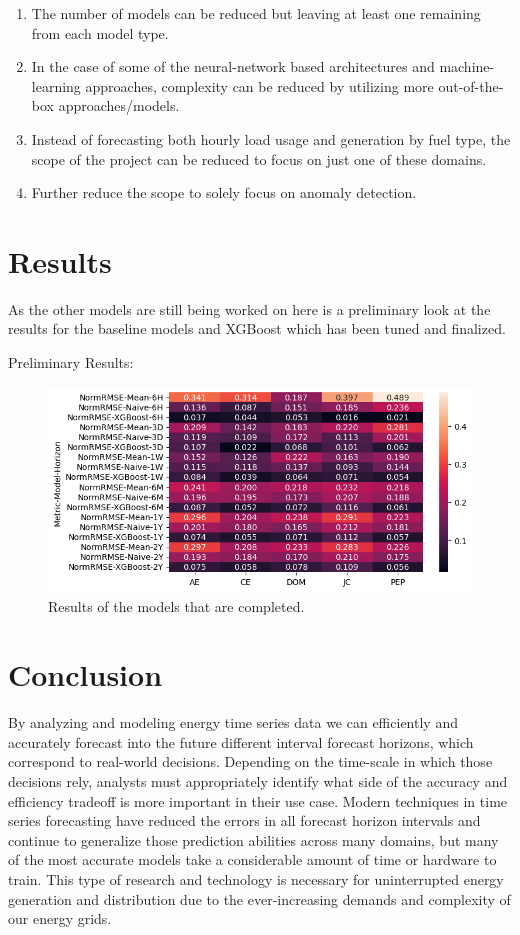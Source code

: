 \documentclass[sigconf]{acmart}
\begin{document}
\begin{enumerate}
  \item The number of models can be reduced but leaving at least one remaining from each model type. 
  \item In the case of some of the neural-network based architectures and machine-learning approaches, complexity can be reduced by utilizing more out-of-the-box approaches/models. 
  \item Instead of forecasting both hourly load usage and generation by fuel type, the scope of the project can be reduced to focus on just one of these domains.
  \item Further reduce the scope to solely focus on anomaly detection.
\end{enumerate}

\section{Results}
As the other models are still being worked on here is a preliminary look at the results for the baseline models and XGBoost which has been tuned and finalized.

Preliminary Results:
  \begin{figure}[hbt!]
    \includegraphics[width=\columnwidth]{Images/Prelim_Results.png}
    \caption{Results of the models that are completed.}
    \Description{}
    \label{fig:results}
  \end{figure}

\section{Conclusion}
By analyzing and modeling energy time series data we can efficiently and accurately forecast into the future different interval forecast horizons, which correspond to real-world decisions. Depending on the time-scale in which those decisions rely, analysts must appropriately identify what side of the accuracy and efficiency tradeoff is more important in their use case. Modern techniques in time series forecasting have reduced the errors in all forecast horizon intervals and continue to generalize those prediction abilities across many domains, but many of the most accurate models take a considerable amount of time or hardware to train. This type of research and technology is necessary for uninterrupted energy generation and distribution due to the ever-increasing demands and complexity of our energy grids.
\end{document}
